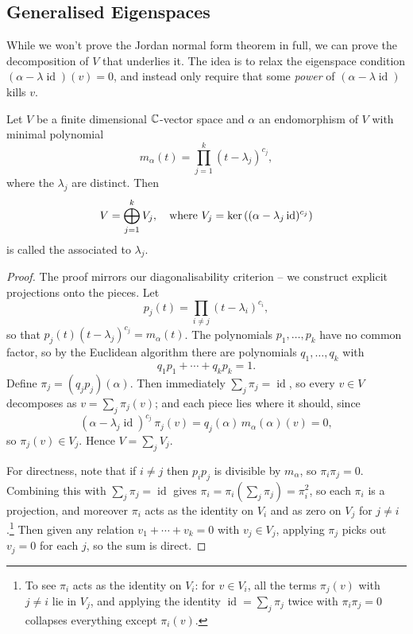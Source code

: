 \documentclass[a4paper]{scrartcl}
\begin{document}
\subsection{Generalised Eigenspaces}

While we won't prove the Jordan normal form theorem in full, we can prove the decomposition of $V$ that underlies it. The idea is to relax the eigenspace condition $(\alpha - \lambda \operatorname{id})(v) = 0$, and instead only require that some \emph{power} of $(\alpha - \lambda\operatorname{id})$ kills $v$.

\begin{theorem}
    Let $V$ be a finite dimensional $\mathbb{C}$-vector space and $\alpha$ an endomorphism of $V$ with minimal polynomial
    $$
    m_\alpha(t) = \prod_{j = 1}^k (t - \lambda_j)^{c_j},
    $$
    where the $\lambda_j$ are distinct. Then
    $$
    V = \bigoplus_{j = 1}^k V_j, \quad \text{where } V_j = \operatorname{ker}\left((\alpha - \lambda_j\operatorname{id})^{c_j}\right)
    $$
    is called the  associated to $\lambda_j$.
\end{theorem}
\begin{proof}
    The proof mirrors our diagonalisability criterion -- we construct explicit projections onto the pieces. Let
    $$
    p_j(t) = \prod_{i \neq j}(t - \lambda_i)^{c_i},
    $$
    so that $p_j (t)(t - \lambda_j)^{c_j} = m_\alpha(t)$. The polynomials $p_1, \dots, p_k$ have no common factor, so by the Euclidean algorithm there are polynomials $q_1, \dots, q_k$ with
    $$
    q_1 p_1 + \cdots + q_k p_k = 1.
    $$
    Define $\pi_j = (q_j p_j)(\alpha)$. Then immediately $\sum_j \pi_j = \operatorname{id}$, so every $v \in V$ decomposes as $v = \sum_j \pi_j(v)$; and each piece lies where it should, since
    $$
    (\alpha - \lambda_j \operatorname{id})^{c_j}\, \pi_j(v) = q_j(\alpha)\, m_\alpha(\alpha)(v) = 0,
    $$
    so $\pi_j(v) \in V_j$. Hence $V = \sum_j V_j$.

    For directness, note that if $i \neq j$ then $p_i p_j$ is divisible by $m_\alpha$, so $\pi_i \pi_j = 0$. Combining this with $\sum_j \pi_j = \operatorname{id}$ gives $\pi_i = \pi_i \left(\sum_j \pi_j\right) = \pi_i^2$, so each $\pi_i$ is a projection, and moreover $\pi_i$ acts as the identity on $V_i$ and as zero on $V_j$ for $j \neq i$.\footnote{To see $\pi_i$ acts as the identity on $V_i$: for $v \in V_i$, all the terms $\pi_j (v)$ with $j \neq i$ lie in $V_j$, and applying the identity $\operatorname{id} = \sum_j \pi_j$ twice with $\pi_i\pi_j = 0$ collapses everything except $\pi_i(v)$.} Then given any relation $v_1 + \cdots + v_k = 0$ with $v_j \in V_j$, applying $\pi_j$ picks out $v_j = 0$ for each $j$, so the sum is direct.
\end{proof}
\end{document}
